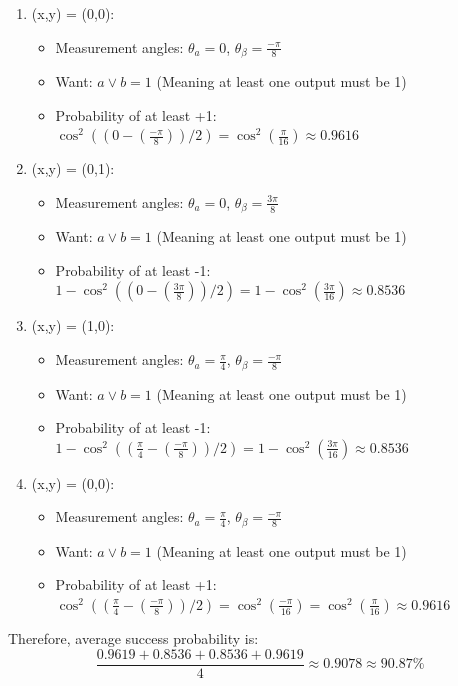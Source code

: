 \documentclass[12pt]{article}
\begin{document}
\begin{enumerate}
    \item (x,y) = (0,0):
    \begin{itemize}
        \item Measurement angles: $\theta_a = 0$, $\theta_\beta = \frac{-\pi}{8}$
        \item Want: $a \vee b = 1$ (Meaning at least one output must be 1)
        \item Probability of at least +1: $\cos^{2}((0 - (\frac{-\pi}{8}))/2) = \cos^2(\frac{\pi}{16}) \approx 0.9616$
    \end{itemize}
    \item (x,y) = (0,1):
    \begin{itemize}
        \item Measurement angles: $\theta_a = 0$, $\theta_\beta = \frac{3\pi}{8}$
        \item Want: $a \vee b = 1$ (Meaning at least one output must be 1)
        \item Probability of at least -1: $1 - \cos^{2}((0 - (\frac{3\pi}{8}))/2) = 1 - \cos^2(\frac{3\pi}{16}) \approx 0.8536$
    \end{itemize}
    \item (x,y) = (1,0):
    \begin{itemize}
        \item Measurement angles: $\theta_a = \frac{\pi}{4}$, $\theta_\beta = \frac{-\pi}{8}$
        \item Want: $a \vee b = 1$ (Meaning at least one output must be 1)
        \item Probability of at least -1: $1 - \cos^{2}((\frac{\pi}{4} - (\frac{-\pi}{8}))/2) = 1 - \cos^2(\frac{3\pi}{16}) \approx 0.8536$
    \end{itemize}
    \item (x,y) = (0,0):
    \begin{itemize}
        \item Measurement angles: $\theta_a = \frac{\pi}{4}$, $\theta_\beta = \frac{-\pi}{8}$
        \item Want: $a \vee b = 1$ (Meaning at least one output must be 1)
        \item Probability of at least +1: $\cos^{2}((\frac{\pi}{4} - (\frac{-\pi}{8}))/2) = \cos^2(\frac{-\pi}{16}) = \cos^2(\frac{\pi}{16}) \approx 0.9616$
    \end{itemize}
\end{enumerate}
Therefore, average success probability is:
\[
\frac{0.9619 + 0.8536 + 0.8536 + 0.9619}{4} \approx 0.9078 \approx \text{90.87\%}
\]
\end{document}
